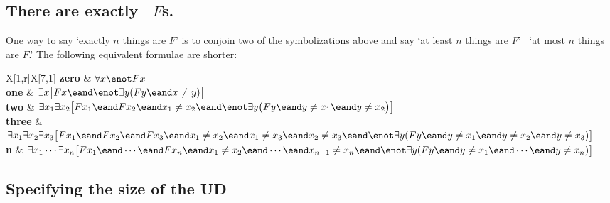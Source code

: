\subsection*{There are exactly \blank\ $F$s.}
\label{summary.exactly}

One way to say `exactly $n$ things are $F$' is to conjoin two of the symbolizations above and say `at least $n$ things are $F$' \eand\ `at most $n$ things are $F$.' The following equivalent formulae are shorter:
\begin{longtabu}{X[1,r]X[7,1]}
\textbf{zero} & $\forall x\enot Fx$ \\

\textbf{one} & $\exists x\bigl[Fx \eand \enot\exists y(Fy \eand x\neq y)\bigr]$ \\

\textbf{two} &  $\exists x_1\exists x_2\bigl[Fx_1 \eand Fx_2 \eand x_1 \neq x_2 \eand \enot\exists y\bigl(Fy \eand y\neq x_1 \eand y \neq x_2\bigr) \bigr]$ \\

\textbf{three} & $\exists x_1\exists x_2\exists x_3\bigl[Fx_1 \eand Fx_2 \eand Fx_3 \eand x_1 \neq x_2 \eand x_1 \neq x_3 \eand x_2 \neq x_3 \eand \enot\exists y(Fy \eand y \neq x_1 \eand y \neq x_2 \eand y\neq x_3) \bigr]$ \\

\textbf{n} & $\exists x_1\cdots\exists x_n\bigl[Fx_1 \eand\cdots\eand Fx_n  \eand x_1 \neq x_2 \eand\cdots\eand x_{n-1}\neq x_n \eand  \enot\exists y(Fy \eand y\neq x_1 \eand \cdots \eand y\neq x_n)\bigr]$ \\
\end{longtabu}

\subsection*{Specifying the size of the UD}

